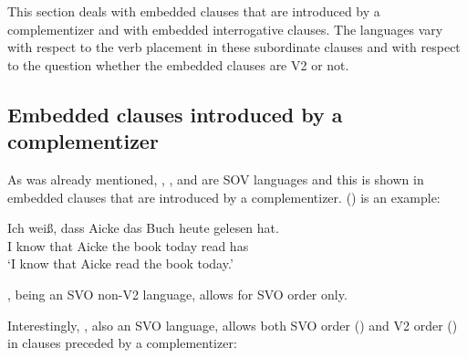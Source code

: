 This section deals with embedded clauses that are introduced by a complementizer and with
embedded interrogative clauses. The  languages vary with respect to the verb placement in
these subordinate clauses and with respect to the question whether the embedded clauses are V2 or not.

\subsection{Embedded clauses introduced by a complementizer}

As was already mentioned, , , and  are SOV languages and this is shown in embedded
clauses that are introduced by a complementizer. () is an example:

\ea
\gll Ich weiß, dass Aicke das Buch heute gelesen hat.\\
     I know that Aicke the book today read has\\
\glt `I know that Aicke read the book today.'
\z

\noindent
{}, being an SVO non-V2 language, allows for SVO order only.
\z

\noindent
Interestingly, , also an SVO language, allows both SVO order () and V2 order () in clauses
preceded by a complementizer:
\z

